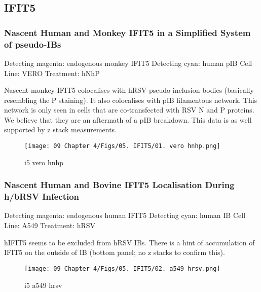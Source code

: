\subsection{IFIT5} \label{subsec:IFIT5}
\subsubsection{Nascent Human and Monkey IFIT5 in a Simplified System of pseudo-IBs} \label{Nascent Human and Monkey IFIT5 in a Simplified System of pseudo-IBs}
Detecting magenta: endogenous monkey IFIT5 \newline
Detecting cyan: human pIB \newline
Cell Line: VERO \newline
Treatment: hNhP \newline

Nascent monkey IFIT5 colocalises with hRSV pseudo inclusion bodies (basically resembling the P staining). It also colocalises with pIB filamentous network. This network is only seen in cells that are co-transfected with RSV N and P proteins. We believe that they are an aftermath of a pIB breakdown. This data is as well supported by z stack measurements.

\begin{figure}
    \centering
    \texttt{[image: 09 Chapter 4/Figs/05. IFIT5/01. vero hnhp.png]}
    \caption[i5 vero hnhp]{i5 vero hnhp}
    \label{fig:i5 vero hnhp}
\end{figure}

\subsubsection{Nascent Human and Bovine IFIT5 Localisation During h/bRSV Infection} \label{Nascent Human and Bovine IFIT5 Localisation During h/bRSV Infection}
 \label{hIFIT5 Localisation During hRSV Infection}
Detecting magenta: endogenous human IFIT5 \newline
Detecting cyan: human IB \newline
Cell Line: A549 \newline
Treatment: hRSV \newline

hIFIT5 seems to be excluded from hRSV IBs. There is a hint of accumulation of IFIT5 on the outside of IB (bottom panel; no z stacks to confirm this). 

\begin{figure}
    \centering
    \texttt{[image: 09 Chapter 4/Figs/05. IFIT5/02. a549 hrsv.png]}
    \caption[i5 a549 hrsv]{i5 a549 hrsv}
    \label{fig:i5 a549 hrsv}
\end{figure}

